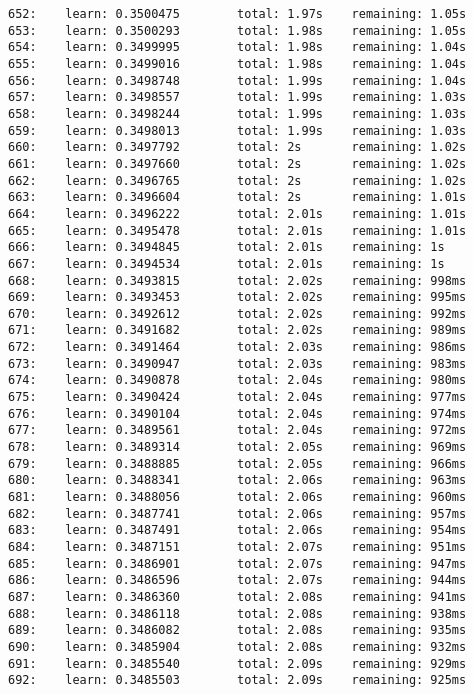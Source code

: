 \documentclass[11pt]{article}
\begin{document}
\begin{Verbatim}[commandchars=\\\{\}]
652:    learn: 0.3500475        total: 1.97s    remaining: 1.05s
653:    learn: 0.3500293        total: 1.98s    remaining: 1.05s
654:    learn: 0.3499995        total: 1.98s    remaining: 1.04s
655:    learn: 0.3499016        total: 1.98s    remaining: 1.04s
656:    learn: 0.3498748        total: 1.99s    remaining: 1.04s
657:    learn: 0.3498557        total: 1.99s    remaining: 1.03s
658:    learn: 0.3498244        total: 1.99s    remaining: 1.03s
659:    learn: 0.3498013        total: 1.99s    remaining: 1.03s
660:    learn: 0.3497792        total: 2s       remaining: 1.02s
661:    learn: 0.3497660        total: 2s       remaining: 1.02s
662:    learn: 0.3496765        total: 2s       remaining: 1.02s
663:    learn: 0.3496604        total: 2s       remaining: 1.01s
664:    learn: 0.3496222        total: 2.01s    remaining: 1.01s
665:    learn: 0.3495478        total: 2.01s    remaining: 1.01s
666:    learn: 0.3494845        total: 2.01s    remaining: 1s
667:    learn: 0.3494534        total: 2.01s    remaining: 1s
668:    learn: 0.3493815        total: 2.02s    remaining: 998ms
669:    learn: 0.3493453        total: 2.02s    remaining: 995ms
670:    learn: 0.3492612        total: 2.02s    remaining: 992ms
671:    learn: 0.3491682        total: 2.02s    remaining: 989ms
672:    learn: 0.3491464        total: 2.03s    remaining: 986ms
673:    learn: 0.3490947        total: 2.03s    remaining: 983ms
674:    learn: 0.3490878        total: 2.04s    remaining: 980ms
675:    learn: 0.3490424        total: 2.04s    remaining: 977ms
676:    learn: 0.3490104        total: 2.04s    remaining: 974ms
677:    learn: 0.3489561        total: 2.04s    remaining: 972ms
678:    learn: 0.3489314        total: 2.05s    remaining: 969ms
679:    learn: 0.3488885        total: 2.05s    remaining: 966ms
680:    learn: 0.3488341        total: 2.06s    remaining: 963ms
681:    learn: 0.3488056        total: 2.06s    remaining: 960ms
682:    learn: 0.3487741        total: 2.06s    remaining: 957ms
683:    learn: 0.3487491        total: 2.06s    remaining: 954ms
684:    learn: 0.3487151        total: 2.07s    remaining: 951ms
685:    learn: 0.3486901        total: 2.07s    remaining: 947ms
686:    learn: 0.3486596        total: 2.07s    remaining: 944ms
687:    learn: 0.3486360        total: 2.08s    remaining: 941ms
688:    learn: 0.3486118        total: 2.08s    remaining: 938ms
689:    learn: 0.3486082        total: 2.08s    remaining: 935ms
690:    learn: 0.3485904        total: 2.08s    remaining: 932ms
691:    learn: 0.3485540        total: 2.09s    remaining: 929ms
692:    learn: 0.3485503        total: 2.09s    remaining: 925ms

\end{Verbatim}
\end{document}
